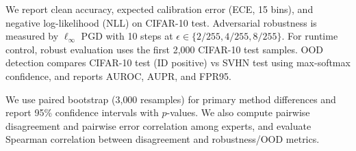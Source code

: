  We report clean accuracy, expected calibration error (ECE, 15 bins), and negative log-likelihood (NLL) on CIFAR-10 test. Adversarial robustness is measured by $\ell_{\infty}$ PGD with 10 steps at $\epsilon\in\{2/255,4/255,8/255\}$. For runtime control, robust evaluation uses the first 2{,}000 CIFAR-10 test samples. OOD detection compares CIFAR-10 test (ID positive) vs SVHN test using max-softmax confidence, and reports AUROC, AUPR, and FPR95.

 We use paired bootstrap (3{,}000 resamples) for primary method differences and report 95\% confidence intervals with $p$-values. We also compute pairwise disagreement and pairwise error correlation among experts, and evaluate Spearman correlation between disagreement and robustness/OOD metrics.
